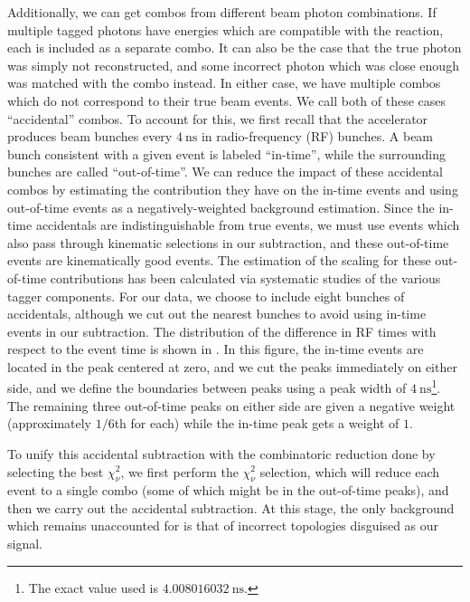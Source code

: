 Additionally, we can get combos from different beam photon combinations. If multiple tagged photons have energies which are compatible with the reaction, each is included as a separate combo. It can also be the case that the true photon was simply not reconstructed, and some incorrect photon which was close enough was matched with the combo instead. In either case, we have multiple combos which do not correspond to their true beam events. We call both of these cases ``accidental'' combos. To account for this, we first recall that the accelerator produces beam bunches every $\SI{4}{\nano\second}$ in radio-frequency (RF) bunches. A beam bunch consistent with a given event is labeled ``in-time'', while the surrounding bunches are called ``out-of-time''. We can reduce the impact of these accidental combos by estimating the contribution they have on the in-time events and using out-of-time events as a negatively-weighted background estimation. Since the in-time accidentals are indistinguishable from true events, we must use events which also pass through kinematic selections in our subtraction, and these out-of-time events are kinematically good events. The estimation of the scaling for these out-of-time contributions has been calculated via systematic studies of the various tagger components. For our data, we choose to include eight bunches of accidentals, although we cut out the nearest bunches to avoid using in-time events in our subtraction. The distribution of the difference in RF times with respect to the event time is shown in . In this figure, the in-time events are located in the peak centered at zero, and we cut the peaks immediately on either side, and we define the boundaries between peaks using a peak width of $\SI{4}{\nano\second}$\footnote{The exact value used is $\SI{4.008016032}{\nano\second}$.}. The remaining three out-of-time peaks on either side are given a negative weight (approximately $1/6$th for each) while the in-time peak gets a weight of $1$.

To unify this accidental subtraction with the combinatoric reduction done by selecting the best $\chi^2_\nu$, we first perform the $\chi^2_\nu$ selection, which will reduce each event to a single combo (some of which might be in the out-of-time peaks), and then we carry out the accidental subtraction. At this stage, the only background which remains unaccounted for is that of incorrect topologies disguised as our signal.

